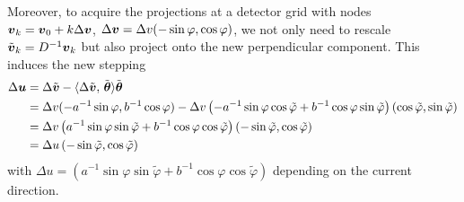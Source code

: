 \documentclass{amsart}
\newcommand*{\Dinv}{{\ensuremath{D^{-1}}}}
\renewcommand*{\phi}{\varphi}
\begin{document}
Moreover, to acquire the projections at a detector grid with nodes 
${\boldsymbol{v}}_k = {\boldsymbol{v}}_0 + k\Delta{\boldsymbol{v}}$, $\Delta \Bv = \Delta v (-\sin\phi, \cos\phi)$, we not only need to rescale $\tilde \Bv_k = \Dinv\Bv_k$ but 
also project onto the new perpendicular component. This induces the new stepping 
%
\begin{align*}
 \Delta\Bu 
 &= \Delta\tilde\Bv - \spr{\Delta\tilde\Bv}{\tilde\Btheta}\tilde\Btheta \\
 &= \Delta v (-a^{-1}\sin\phi, b^{-1}\cos\phi) - \Delta v \left(-a^{-1}\sin\phi \cos\tilde\phi + b^{-1}\cos\phi \sin\tilde\phi\right) 
 \left(\cos\tilde\phi,  \sin\tilde\phi\right) \\
 &= \Delta v \left(a^{-1} \sin\phi \sin\tilde\phi + b^{-1} \cos\phi \cos\tilde\phi \right) \left(-\sin\tilde\phi, \cos\tilde\phi\right) \\
 &= \Delta u \left(-\sin\tilde\phi, \cos\tilde\phi\right)
\end{align*}
%
with $\Delta u = \left(a^{-1} \sin\phi \sin\tilde\phi + b^{-1} \cos\phi \cos\tilde\phi \right)$ depending on the current direction.
\end{document}
